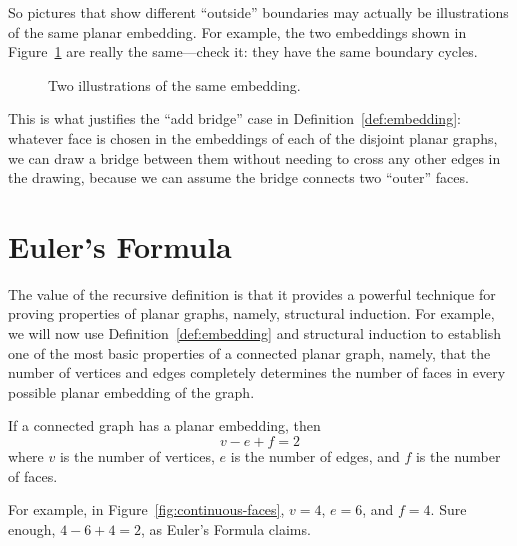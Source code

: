 So pictures that show different ``outside'' boundaries may actually be
illustrations of the same planar embedding.  For example, the two
embeddings shown in Figure~\ref{fig:5DE} are really the same---check
it: they have the same boundary cycles.

\begin{figure}


\caption{Two illustrations of the same embedding.}
\label{fig:5DE}
\end{figure}

This is what justifies the ``add bridge'' case in
Definition~\ref{def:embedding}: whatever face is chosen in the
embeddings of each of the disjoint planar graphs, we can draw a
bridge between them without needing to cross any other edges in the
drawing, because we can assume the bridge connects two ``outer''
faces.

\begin{problems}
\practiceproblems
{}

\end{problems}


\section{Euler's Formula}

The value of the recursive definition is that it provides a powerful
technique for proving properties of planar graphs, namely, structural
induction.  For example, we will now use
Definition~\ref{def:embedding} and structural induction to establish
one of the most basic properties of a connected planar graph, namely,
that the number of vertices and edges completely determines the number
of faces in every possible planar embedding of the graph.

\begin{theorem}\label{thm:eulers_formula}
If a connected graph has a planar embedding, then
\begin{equation*}
    v - e + f = 2
\end{equation*}
where $v$ is the number of vertices, $e$ is the number of edges, and
$f$ is the number of faces.
\end{theorem}

For example, in Figure~\ref{fig:continuous-faces}, $v = 4$,
$e = 6$, and $f = 4$.  Sure enough, $4 - 6 + 4 = 2$, as Euler's
Formula claims.

